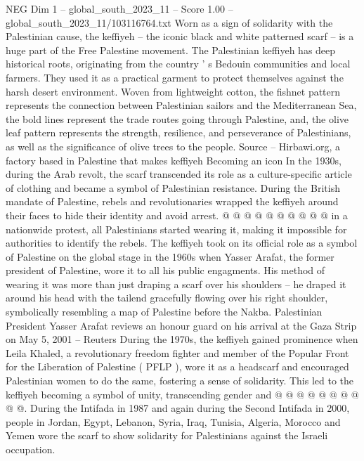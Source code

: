 \begin{textsample}{NEG Dim 1 – global\_south\_2023\_11 – Score 1.00 – global\_south\_2023\_11/103116764.txt}  \label{ex:f1_neg_319}
Worn as a sign of solidarity with the Palestinian cause, the keffiyeh -- the iconic black and white patterned scarf -- is a huge part of the Free Palestine movement.
The Palestinian keffiyeh has deep historical roots, originating from the country ' s Bedouin communities and local farmers.
They used it as a practical garment to protect themselves against the harsh desert environment.
Woven from lightweight cotton, the fishnet pattern represents the connection between Palestinian sailors and the Mediterranean Sea, the bold lines represent the trade routes going through Palestine, and, the olive leaf pattern represents the strength, resilience, and perseverance of Palestinians, as well as the significance of olive trees to the people.
Source -- Hirbawi.org, a factory based in Palestine that makes keffiyeh Becoming an icon In the 1930s, during the Arab revolt, the scarf transcended its role as a culture-specific article of clothing and became a symbol of Palestinian resistance.
During the British mandate of Palestine, rebels and revolutionaries wrapped the keffiyeh around their faces to hide their identity and avoid arrest. @ @ @ @ @ @ @ @ @ @ in a nationwide protest, all Palestinians started wearing it, making it impossible for authorities to identify the rebels.
The keffiyeh took on its official role as a symbol of Palestine on the global stage in the 1960s when Yasser Arafat, the former president of Palestine, wore it to all his public engagments.
His method of wearing it was more than just draping a scarf over his shoulders -- he draped it around his head with the tailend gracefully flowing over his right shoulder, symbolically resembling a map of Palestine before the Nakba.
Palestinian President Yasser Arafat reviews an honour guard on his arrival at the Gaza Strip on May 5, 2001 -- Reuters During the 1970s, the keffiyeh gained prominence when Leila Khaled, a revolutionary freedom fighter and member of the Popular Front for the Liberation of Palestine ( PFLP ), wore it as a headscarf and encouraged Palestinian women to do the same, fostering a sense of solidarity.
This led to the keffiyeh becoming a symbol of unity, transcending gender and @ @ @ @ @ @ @ @ @ @.
During the Intifada in 1987 and again during the Second Intifada in 2000, people in Jordan, Egypt, Lebanon, Syria, Iraq, Tunisia, Algeria, Morocco and Yemen wore the scarf to show solidarity for Palestinians against the Israeli occupation.

\end{textsample}
